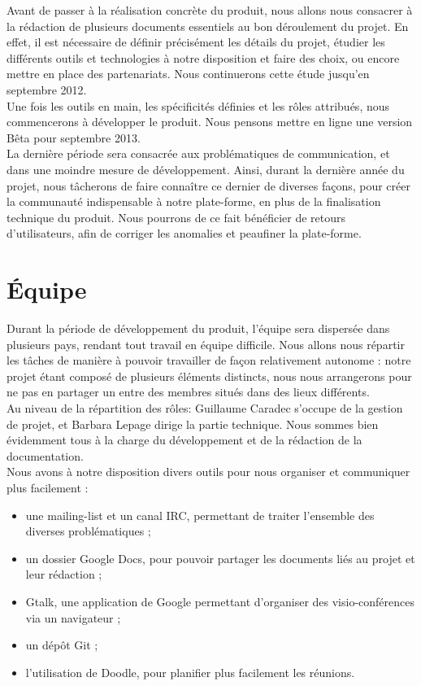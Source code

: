 \documentclass{life-fr}
\begin{document}
Avant de passer à la réalisation concrète du produit, nous allons nous consacrer à la rédaction de plusieurs documents essentiels au bon déroulement du projet. En effet, il est nécessaire de définir précisément les détails du projet, étudier les différents outils et technologies à notre disposition et faire des choix, ou encore mettre en place des partenariats. Nous continuerons cette étude jusqu'en septembre 2012.\\

Une fois les outils en main, les spécificités définies et les rôles attribués, nous commencerons à développer le produit. Nous pensons mettre en ligne une version Bêta pour septembre 2013.\\

La dernière période sera consacrée aux problématiques de communication, et dans une moindre mesure de développement. Ainsi, durant la dernière année du projet, nous tâcherons de faire connaître ce dernier de diverses façons, pour créer la communauté indispensable à notre plate-forme, en plus de la finalisation technique du produit. Nous pourrons de ce fait bénéficier de retours d'utilisateurs, afin de corriger les anomalies et peaufiner la plate-forme.

\section{Équipe}

Durant la période de développement du produit, l'équipe sera dispersée dans plusieurs pays, rendant tout travail en équipe difficile. Nous allons nous répartir les tâches de manière à pouvoir travailler de façon relativement autonome : notre projet étant composé de plusieurs éléments distincts, nous nous arrangerons pour ne pas en partager un entre des membres situés dans des lieux différents.\\

Au niveau de la répartition des rôles: Guillaume Caradec s'occupe de la gestion de projet, et Barbara Lepage dirige la partie technique. Nous sommes bien évidemment tous à la charge du développement et de la rédaction de la documentation.\\

Nous avons à notre disposition divers outils pour nous organiser et communiquer plus facilement :\\

\begin{itemize}
  \item une mailing-list et un canal IRC, permettant de traiter l'ensemble des diverses problématiques ;
  \item un dossier Google Docs, pour pouvoir partager les documents liés au projet et leur rédaction ;
  \item Gtalk, une application de Google permettant d'organiser des visio-conférences via un navigateur ;
  \item un dépôt Git ;
  \item l'utilisation de Doodle, pour planifier plus facilement les réunions.
\end{itemize}
\end{document}
